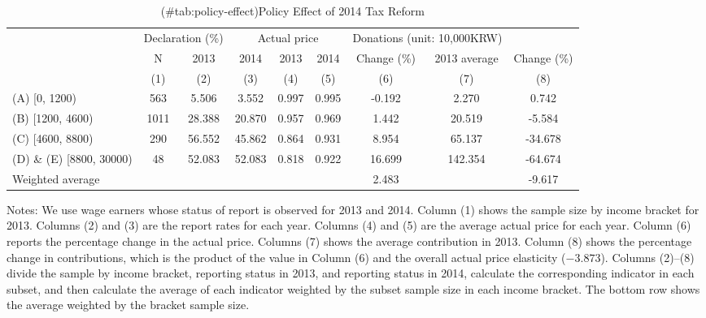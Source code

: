 \begin{table}

\caption{(\#tab:policy-effect)Policy Effect of 2014 Tax Reform}
\centering
\fontsize{8}{10}\selectfont
\begin{threeparttable}
\begin{tabular}[t]{>{\raggedright\arraybackslash}p{10em}cccccccc}
\toprule
\multicolumn{2}{c}{ } & \multicolumn{2}{c}{Declaration (\%)} & \multicolumn{3}{c}{Actual price} & \multicolumn{2}{c}{Donations (unit: 10,000KRW)} \\
\cmidrule(l{3pt}r{3pt}){3-4} \cmidrule(l{3pt}r{3pt}){5-7} \cmidrule(l{3pt}r{3pt}){8-9}
\multicolumn{1}{c}{2013 Income bracket} & \multicolumn{1}{c}{N} & \multicolumn{1}{c}{2013} & \multicolumn{1}{c}{2014} & \multicolumn{1}{c}{2013} & \multicolumn{1}{c}{2014} & \multicolumn{1}{c}{Change (\%)} & \multicolumn{1}{c}{2013 average} & \multicolumn{1}{c}{Change (\%)} \\
\cmidrule(l{3pt}r{3pt}){1-1} \cmidrule(l{3pt}r{3pt}){2-2} \cmidrule(l{3pt}r{3pt}){3-3} \cmidrule(l{3pt}r{3pt}){4-4} \cmidrule(l{3pt}r{3pt}){5-5} \cmidrule(l{3pt}r{3pt}){6-6} \cmidrule(l{3pt}r{3pt}){7-7} \cmidrule(l{3pt}r{3pt}){8-8} \cmidrule(l{3pt}r{3pt}){9-9}
 & (1) & (2) & (3) & (4) & (5) & (6) & (7) & (8)\\
\midrule
(A) [0, 1200) & 563 & 5.506 & 3.552 & 0.997 & 0.995 & -0.192 & 2.270 & 0.742\\
(B) [1200, 4600) & 1011 & 28.388 & 20.870 & 0.957 & 0.969 & 1.442 & 20.519 & -5.584\\
(C) [4600, 8800) & 290 & 56.552 & 45.862 & 0.864 & 0.931 & 8.954 & 65.137 & -34.678\\
(D) \& (E) [8800, 30000) & 48 & 52.083 & 52.083 & 0.818 & 0.922 & 16.699 & 142.354 & -64.674\\
Weighted average &  &  &  &  &  & 2.483 &  & -9.617\\
\bottomrule
\end{tabular}
\begin{tablenotes}
\item Notes: We use wage earners whose status of report is observed for 2013 and 2014. Column (1) shows the sample size by income bracket for 2013. Columns (2) and (3) are the report rates for each year. Columns (4) and (5) are the average actual price for each year. Column (6) reports the percentage change in the actual price. Columns (7) shows the average contribution in 2013. Column (8) shows the percentage change in contributions, which is the product of the value in Column (6) and the overall actual price elasticity ($-3.873$). Columns (2)--(8) divide the sample by income bracket, reporting status in 2013, and reporting status in 2014, calculate the corresponding indicator in each subset, and then calculate the average of each indicator weighted by the subset sample size in each income bracket. The bottom row shows the average weighted by the bracket sample size.
\end{tablenotes}
\end{threeparttable}
\end{table}

